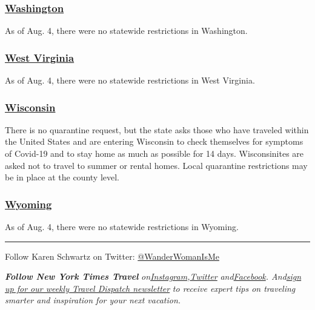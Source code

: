 \hypertarget{washington}{%
\subsubsection{\texorpdfstring{\href{https://www.experiencewa.com/articles/date-coronavirus-travel-advisory}{Washington}}{Washington}}\label{washington}}

As of Aug. 4, there were no statewide restrictions in Washington.

\hypertarget{west-virginia}{%
\subsubsection{\texorpdfstring{\href{https://wvtourism.com/travel-alert/}{West
Virginia}}{West Virginia}}\label{west-virginia}}

As of Aug. 4, there were no statewide restrictions in West Virginia.

\hypertarget{wisconsin}{%
\subsubsection{\texorpdfstring{\href{https://www.dhs.wisconsin.gov/covid-19/travel.htm}{Wisconsin}}{Wisconsin}}\label{wisconsin}}

There is no quarantine request, but the state asks those who have
traveled within the United States and are entering Wisconsin to check
themselves for symptoms of Covid-19 and to stay home as much as possible
for 14 days. Wisconsinites are asked not to travel to summer or rental
homes. Local quarantine restrictions may be in place at the county
level.

\hypertarget{wyoming}{%
\subsubsection{\texorpdfstring{\href{https://health.wyo.gov/publichealth/infectious-disease-epidemiology-unit/disease/novel-coronavirus/covid-19-orders-and-guidance/}{Wyoming}}{Wyoming}}\label{wyoming}}

As of Aug. 4, there were no statewide restrictions in Wyoming.

\begin{center}\rule{0.5\linewidth}{\linethickness}\end{center}

Follow Karen Schwartz on Twitter:
\href{https://twitter.com/wanderwomanisme?lang=en}{@WanderWomanIsMe}

\emph{\textbf{Follow New York Times Travel}}
\emph{on}\href{https://www.instagram.com/nytimestravel/}{\emph{Instagram}}\emph{,}\href{https://twitter.com/nytimestravel}{\emph{Twitter}}
\emph{and}\href{https://www.facebookcorewwwi.onion/nytimestravel/}{\emph{Facebook}}\emph{.
And}\href{https://www.nytimes3xbfgragh.onion/newsletters/traveldispatch}{\emph{sign
up for our weekly Travel Dispatch newsletter}} \emph{to receive expert
tips on traveling smarter and inspiration for your next vacation.}


